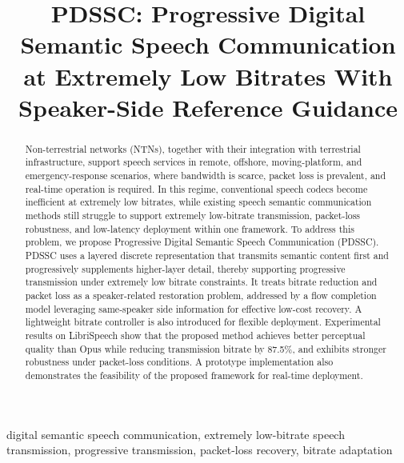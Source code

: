 \documentclass[conference]{IEEEtran}
\begin{document}
\title{PDSSC: Progressive Digital Semantic Speech Communication at Extremely Low Bitrates With Speaker-Side Reference Guidance}

\author{
}

\maketitle

\begin{abstract}
Non-terrestrial networks (NTNs), together with their integration with terrestrial infrastructure, support speech services in remote, offshore, moving-platform, and emergency-response scenarios, where bandwidth is scarce, packet loss is prevalent, and real-time operation is required. In this regime, conventional speech codecs become inefficient at extremely low bitrates, while existing speech semantic communication methods still struggle to support extremely low-bitrate transmission, packet-loss robustness, and low-latency deployment within one framework. To address this problem, we propose Progressive Digital Semantic Speech Communication (PDSSC). PDSSC uses a layered discrete representation that transmits semantic content first and progressively supplements higher-layer detail, thereby supporting progressive transmission under extremely low bitrate constraints. It treats bitrate reduction and packet loss as a speaker-related restoration problem, addressed by a flow completion model leveraging same-speaker side information for effective low-cost recovery. A lightweight bitrate controller is also introduced for flexible deployment. Experimental results on LibriSpeech show that the proposed method achieves better perceptual quality than Opus while reducing transmission bitrate by 87.5\%, and exhibits stronger robustness under packet-loss conditions. A prototype implementation also demonstrates the feasibility of the proposed framework for real-time deployment.
\end{abstract}

\begin{IEEEkeywords}
digital semantic speech communication, extremely low-bitrate speech transmission, progressive transmission, packet-loss recovery, bitrate adaptation
\end{IEEEkeywords}
\end{document}

